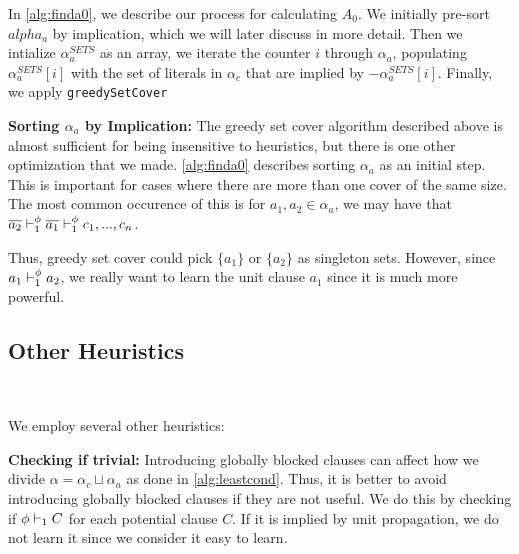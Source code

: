 In \autoref{alg:finda0}, we describe our process for calculating $A_0$. We initially pre-sort $alpha_a$ by implication, which we will later discuss in more detail. Then we intialize $\alpha_a^{SETS}$ as an array, we iterate the counter $i$ through $\alpha_a$, populating $\alpha_a^{SETS}[i]$ with the set of literals in $\alpha_c$ that are implied by $-\alpha_a^{SETS}[i]$. Finally, we apply \texttt{greedySetCover}



\noindent \textbf{Sorting $\alpha_a$ by Implication:}%
The greedy set cover algorithm described above is almost sufficient for being insensitive to heuristics, but there is one other optimization that we made. \autoref{alg:finda0} describes sorting $\alpha_a$ as an initial step. This is important for cases where there are more than one cover of the same size. The most common occurence of this is for $a_1, a_2 \in \alpha_a$, we may have that $\overline{a_2} \vdash_1^\phi \overline{a_1} \vdash_1^\phi c_1, ..., c_n$. 

Thus, greedy set cover could pick $\{a_1\}$ or $\{a_2\}$ as singleton sets. However, since $a_1 \vdash_1^\phi a_2$, we really want to learn the unit clause $a_1$ since it is much more powerful.

\subsection{Other Heuristics}~\label{subsec:heuristics}

We employ several other heuristics:

\noindent \textbf{Checking if trivial:} Introducing globally blocked clauses can affect how we divide $\alpha = \alpha_c \sqcup \alpha_a$ as done in \autoref{alg:leastcond}. Thus, it is better to avoid introducing globally blocked clauses if they are not useful. We do this by checking if $\phi \vdash_1 C$ for each potential clause $C$. If it is implied by unit propagation, we do not learn it since we consider it easy to learn.